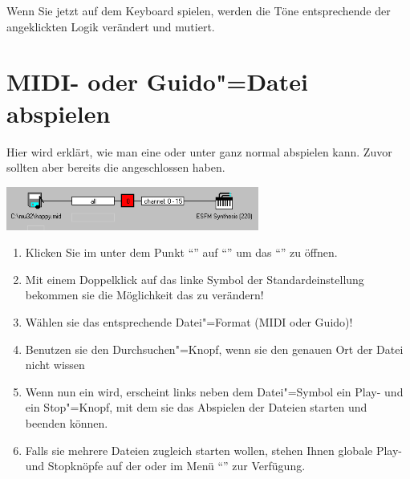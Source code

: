 Wenn Sie jetzt auf dem Keyboard spielen, werden die Töne entsprechende 
der angeklickten Logik verändert und mutiert.

\section{MIDI- oder Guido"=Datei abspielen}
\label{sec:CC_MIDIIN}


Hier wird erklärt, wie man eine 
oder  unter \mutabor{} ganz normal 
abspielen kann. Zuvor sollten aber bereits die  
angeschlossen haben.


\begin{center}
\ifhtml
{}
\else
\includegraphics[width=235.5pt]{cc_midiin}
\fi
\end{center}

\begin{enumerate}
\item Klicken Sie im  unter dem Punkt
  "`"' auf
  "`"' um das
  "`"' zu öffnen.
\item Mit einem Doppelklick auf das linke Symbol der
  Standardeinstellung bekommen sie die Möglichkeit das
   zu verändern!
\item Wählen sie das entsprechende Datei"=Format (MIDI oder Guido)!
\item Benutzen sie den Durchsuchen"=Knopf, wenn sie den genauen Ort
  der Datei nicht wissen
\item Wenn nun ein 
   wird, erscheint links neben
  dem Datei"=Symbol ein Play- und ein Stop"=Knopf, mit dem sie das
  Abspielen der Dateien starten und beenden können.
\item Falls sie mehrere Dateien zugleich starten wollen, stehen Ihnen
  globale Play- und Stopknöpfe auf der
   oder im Menü
  "`"' zur Verfügung.
\end{enumerate}


